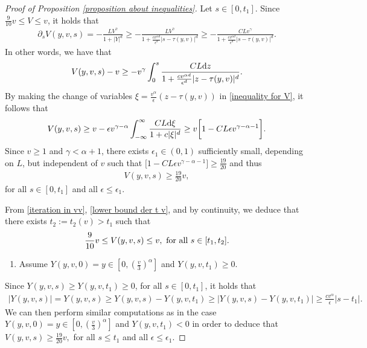 \documentclass[11pt]{article}
\numberwithin{equation}{section}
\newcommand{\der}{\textup{d}}
\begin{document}
\begin{proof}[Proof of Proposition \ref{proposition about inequalities}]
Let $s\in[0,t_{1}]$. Since $\frac{9}{10}v\leq V\leq v$, it holds that
\begin{align*}
    \partial_{s}{V}(y,v,s)=-\frac{{L}{V}^{\gamma}}{1+|{Y}|^{d}}\geq -\frac{{L}{V}^{\gamma}}{1+\frac{c v^{\alpha d}}{\epsilon^{d}}|s-\tau(y,v)|^{d}}\geq -\frac{C{L}{v}^{\gamma}}{1+\frac{c v^{\alpha d}}{\epsilon^{d}}|s-\tau(y,v)|^{d}}.
\end{align*}
In other words, we have that
\begin{align}\label{inequality for V}
    V(y,v,s)-v\geq -v^{\gamma}\int_{0}^{s}\frac{CL\der z}{1+\frac{c v^{\alpha d}}{\epsilon^{d}}|z-\tau(y,v)|^{d}}.
\end{align}
By making the change of variables $\xi=\frac{v^{\alpha}}{\epsilon}(z-\tau(y,v))$ in \eqref{inequality for V}, it follows that
\begin{align}\label{epsilon does not depend on v}
    V(y,v,s)\geq v -\epsilon v^{\gamma-\alpha}\int_{-\infty}^{\infty}\frac{CL\der \xi}{1+c|\xi|^{d}}\geq v\bigg[1-CL\epsilon v^{\gamma-\alpha-1}\bigg].
\end{align}
Since $v\geq 1$ and $\gamma<\alpha+1$, there exists $\epsilon_{1}\in(0,1)$ sufficiently small, depending on $L$, but independent of $v$ such that $\bigg[1-CL\epsilon v^{\gamma-\alpha-1}\bigg]\geq \frac{19}{20}$ and thus
\begin{align}\label{iteration in vv}
    V(y,v,s)\geq \frac{19}{20}v,
\end{align}
for all $s\in[0,t_{1}]$ and all $\epsilon\leq \epsilon_{1}$. 

From \eqref{iteration in vv}, \eqref{lower bound der t v}, and by continuity, we deduce that there exists $t_{2}:=t_{2}(v)>t_{1}$ such that
  \begin{align*}
      \frac{9}{10}v\leq V(y,v,s)\leq v,       \textup{ for all } s\in[t_{1},t_{2}].
      \end{align*}

 \begin{enumerate}\item[ii)]   Assume $Y(y,v,0)=y\in[0,(\frac{v}{3})^{\alpha}]$ and  $Y(y,v,t_{1})\geq 0$. 
 \end{enumerate}Since $Y(y,v,s)\geq Y(y,v,t_{1})\geq 0$, for all $s\in[0,t_{1}]$, it holds that
\begin{align*}
 |Y(y,v,s)|=Y(y,v,s)\geq Y(y,v,s)-Y(y,v,t_{1})\geq   |Y(y,v,s)-Y(y,v,t_{1})|\geq \frac{c v^{\alpha}}{\epsilon}|s- t_{1}|.
\end{align*}
    We can then perform similar computations as in the case $Y(y,v,0)=y\in[0,(\frac{v}{3})^{\alpha}]$ and  $Y(y,v,t_{1})< 0$ in order to deduce that $V(y,v,s)\geq \frac{19}{20}v,$ for all $s\leq t_{1}$ and all $\epsilon\leq \epsilon_{1}$. 
      

\end{proof}
\end{document}
